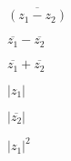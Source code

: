 \documentclass[12pt,addpoints,x11names]{exam}
\begin{document}
\begin{questions}
\question $\overline{(z_1-z_2)}$
   \begin{solutionbox}{1in}
    
  \end{solutionbox}

\question $\overline{z_1}-\overline{z_2}$
   \begin{solutionbox}{1in}
    
  \end{solutionbox}

\question $\overline{z_1}+\overline{z_2}$
   \begin{solutionbox}{1in}
    
  \end{solutionbox}

\question $|z_1|$
   \begin{solutionbox}{1in}
    
  \end{solutionbox}

\question $|\overline{z_2}|$
   \begin{solutionbox}{1in}
    
  \end{solutionbox}

\question $|z_1|^{2}$
  \begin{solutionbox}{1in}
    
  \end{solutionbox}
  
\end{questions}
\end{document}
